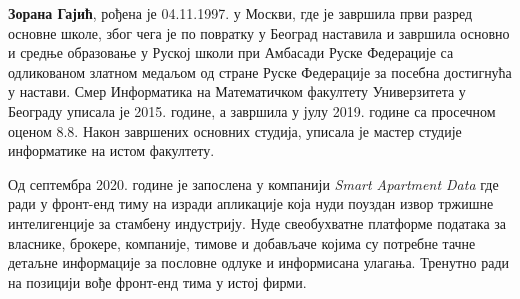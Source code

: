 \documentclass[12pt,oneside]{memoir}
\begin{document}
\begin{biografija}
\textbf{Зорана Гајић}, рођена је 04.11.1997. у Москви, где је завршила први разред основне школе, због чега је по повратку у Београд наставила и завршила основно и средње образовање у Руској школи при Амбасади Руске Федерације са одликованом златном медаљом од стране Руске Федерације за посебна достигнућа у настави. Смер Информатика на Математичком факултету Универзитета у Београду уписала је 2015. године, а завршила у јулу 2019. године са просечном оценом 8.8. Након завршених основних студија, уписала је мастер студије информатике на истом факултету.

Од септембра 2020. године је запослена у компанији \textit{Smart Apartment Data} где ради у фронт-енд тиму на изради апликације која нуди поуздан извор тржишне интелигенције за стамбену индустрију. Нуде свеобухватне платформе података за власнике, брокере, компаније, тимове и добављаче којима су потребне тачне детаљне информације за пословне одлуке и информисана улагања. Тренутно ради на позицији вође фронт-енд тима у истој фирми.
\end{biografija}
\end{document}
